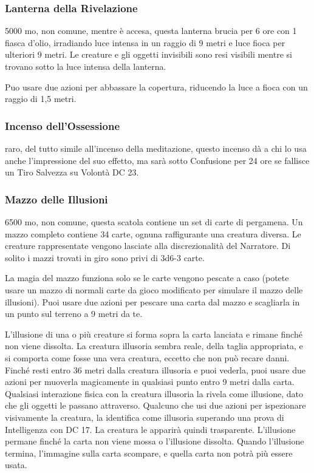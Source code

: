 \begin{multicols}{2}
	\subsubsection*{Lanterna della Rivelazione}
	5000 mo, non comune, mentre è accesa, questa lanterna brucia per 6 ore con 1 fiasca d'olio, irradiando luce intensa in un raggio di 9 metri e luce fioca per ulteriori 9 metri. Le creature e gli oggetti invisibili sono resi visibili mentre si trovano sotto la luce intensa della lanterna.

	Puo usare due azioni per abbassare la copertura, riducendo la luce a fioca con un raggio di 1,5 metri.

	\subsubsection*{Incenso dell’Ossessione}
	raro, del tutto simile all’incenso della meditazione, questo incenso dà a chi lo usa anche l'impressione del suo effetto, ma sarà sotto Confusione per 24 ore se fallisce un Tiro Salvezza su Volontà DC 23.

	\subsubsection*{Mazzo delle Illusioni}
	6500 mo, non comune, questa scatola contiene un set di carte di pergamena. Un mazzo completo contiene 34 carte, ognuna raffigurante una creatura diversa. Le creature rappresentate vengono lasciate alla discrezionalità del Narratore. Di solito i mazzi trovati in giro sono privi di 3d6-3 carte.

	La magia del mazzo funziona solo se le carte vengono pescate a caso (potete usare un mazzo di normali carte da gioco modificato per simulare il mazzo delle illusioni). Puoi usare due azioni per pescare una carta dal mazzo e scagliarla in un punto sul terreno a 9 metri da te.

	L'illusione di una o più creature si forma sopra la carta lanciata e rimane finché non viene dissolta. La creatura illusoria sembra reale, della taglia appropriata, e si comporta come fosse una vera creatura, eccetto che non può recare danni. Finché resti entro 36 metri dalla creatura illusoria e puoi vederla, puoi usare due azioni per muoverla magicamente in qualsiasi punto entro 9 metri dalla carta. Qualsiasi interazione fisica con la creatura illusoria la rivela come illusione, dato che gli oggetti le passano attraverso. Qualcuno che usi due azioni per ispezionare visivamente la creatura, la identifica come illusoria superando una prova di Intelligenza con DC 17. La creatura le apparirà quindi trasparente.
	L'illusione permane finché la carta non viene mossa o l'illusione dissolta. Quando l'illusione termina, l'immagine sulla carta scompare, e quella carta non potrà più essere usata.

\end{multicols}

